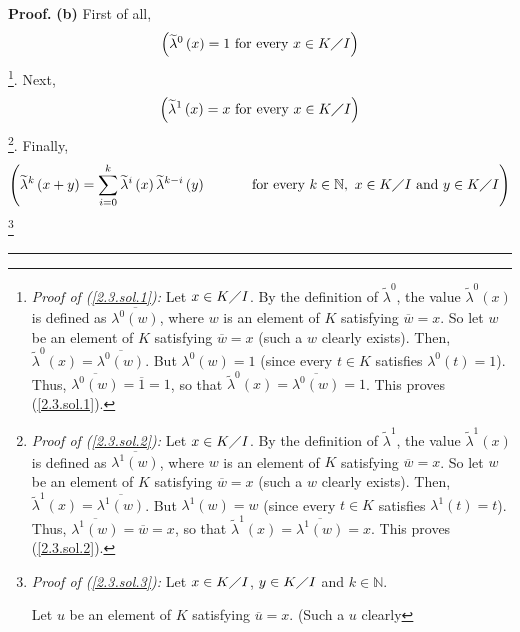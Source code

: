 \documentclass[numbers=enddot,12pt,final,onecolumn,notitlepage]{scrartcl}%
\newenvironment{proof}[1][Proof]{\noindent\textbf{#1.} }{\ \rule{0.5em}{0.5em}}
\begin{document}
\begin{proof}
\textbf{(b)} First of all,%
\begin{equation}
\left(  \widetilde{\lambda}^{0}\left(  x\right)  =1\text{ for every }x\in
K\diagup I\right)  \label{2.3.sol.1}%
\end{equation}
\footnote{\textit{Proof of (\ref{2.3.sol.1}):} Let $x\in K\diagup I$. By the
definition of $\widetilde{\lambda}^{0}$, the value $\widetilde{\lambda}%
^{0}\left(  x\right)  $ is defined as $\overline{\lambda^{0}\left(  w\right)
}$, where $w$ is an element of $K$ satisfying $\overline{w}=x$. So let $w$ be
an element of $K$ satisfying $\overline{w}=x$ (such a $w$ clearly exists).
Then, $\widetilde{\lambda}^{0}\left(  x\right)  =\overline{\lambda^{0}\left(
w\right)  }$. But $\lambda^{0}\left(  w\right)  =1$ (since every $t\in K$
satisfies $\lambda^{0}\left(  t\right)  =1$). Thus, $\overline{\lambda
^{0}\left(  w\right)  }=\overline{1}=1$, so that $\widetilde{\lambda}%
^{0}\left(  x\right)  =\overline{\lambda^{0}\left(  w\right)  }=1$. This
proves (\ref{2.3.sol.1}).}. Next,%
\begin{equation}
\left(  \widetilde{\lambda}^{1}\left(  x\right)  =x\text{ for every }x\in
K\diagup I\right)  \label{2.3.sol.2}%
\end{equation}
\footnote{\textit{Proof of (\ref{2.3.sol.2}):} Let $x\in K\diagup I$. By the
definition of $\widetilde{\lambda}^{1}$, the value $\widetilde{\lambda}%
^{1}\left(  x\right)  $ is defined as $\overline{\lambda^{1}\left(  w\right)
}$, where $w$ is an element of $K$ satisfying $\overline{w}=x$. So let $w$ be
an element of $K$ satisfying $\overline{w}=x$ (such a $w$ clearly exists).
Then, $\widetilde{\lambda}^{1}\left(  x\right)  =\overline{\lambda^{1}\left(
w\right)  }$. But $\lambda^{1}\left(  w\right)  =w$ (since every $t\in K$
satisfies $\lambda^{1}\left(  t\right)  =t$). Thus, $\overline{\lambda
^{1}\left(  w\right)  }=\overline{w}=x$, so that $\widetilde{\lambda}%
^{1}\left(  x\right)  =\overline{\lambda^{1}\left(  w\right)  }=x$. This
proves (\ref{2.3.sol.2}).}. Finally,%
\begin{equation}
\left(  \widetilde{\lambda}^{k}\left(  x+y\right)  =\sum_{i=0}^{k}%
\widetilde{\lambda}^{i}\left(  x\right)  \widetilde{\lambda}^{k-i}\left(
y\right)  \ \ \ \ \ \ \ \ \ \ \text{for every }k\in\mathbb{N},\text{ }x\in
K\diagup I\text{ and }y\in K\diagup I\right)  \label{2.3.sol.3}%
\end{equation}
\footnote{\textit{Proof of (\ref{2.3.sol.3}):} Let $x\in K\diagup I$, $y\in
K\diagup I$ and $k\in\mathbb{N}$.
\par
Let $u$ be an element of $K$ satisfying $\overline{u}=x$. (Such a $u$ clearly
}
\end{proof}
\end{document}
